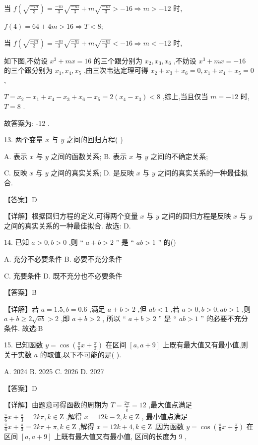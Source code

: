 \documentclass[10pt]{article}
\begin{document}
当 \(f\left( \sqrt{\frac{-m}{3}}\right)  = \frac{-m}{3}\sqrt{\frac{-m}{3}} + m\sqrt{\frac{-m}{3}} >  - {16} \Rightarrow  m >  - {12}\) 时,

\(f\left( 4\right)  = {64} + {4m} > {16} \Rightarrow  T < 8;\)

当 \(f\left( \sqrt{\frac{-m}{3}}\right)  = \frac{-m}{3}\sqrt{\frac{-m}{3}} + m\sqrt{\frac{-m}{3}} <  - {16} \Rightarrow  m <  - {12}\) 时,

如下图,不妨设 \({x}^{3} + {mx} = {16}\) 的三个跟分别为 \({x}_{2},{x}_{3},{x}_{6}\) ,不妨设 \({x}^{3} + {mx} =  - {16}\) 的三个跟分别为 \({x}_{1},{x}_{4},{x}_{5}\) ,由三次韦达定理可得 \({x}_{2} + {x}_{3} + {x}_{6} = 0,{x}_{1} + {x}_{4} + {x}_{5} = 0\) ,

\(T = {x}_{2} - {x}_{1} + {x}_{4} - {x}_{3} + {x}_{6} - {x}_{5} = 2\left( {{x}_{4} - {x}_{3}}\right)  < 8\) ,综上,当且仅当 \(m =  - {12}\) 时, \(T = 8\) .

故答案为: -12 .

13. 两个变量 \(x\) 与 \(y\) 之间的回归方程( )

A. 表示 \(x\) 与 \(y\) 之间的函数关系; B. 表示 \(x\) 与 \(y\) 之间的不确定关系;

C. 反映 \(x\) 与 \(y\) 之间的真实关系; D. 是反映 \(x\) 与 \(y\) 之间的真实关系的一种最佳拟合.

【答案】D

【详解】根据回归方程的定义,可得两个变量 \(x\) 与 \(y\) 之间的回归方程是反映 \(x\) 与 \(y\) 之间的真实关系的一种最佳拟合. 故选: D.

14. 已知 \(a > 0,b > 0\) ,则 “ \(a + b > 2\) ” 是 “ \({ab} > 1\) ” 的()

A. 充分不必要条件 B. 必要不充分条件

C. 充要条件 D. 既不充分也不必要条件

【答案】B

【详解】若 \(a = {1.5},b = {0.6}\) ,满足 \(a + b > 2\) ,但 \({ab} < 1\) ,若 \(a > 0,b > 0,{ab} > 1\) ,则 \(a + b \geq  2\sqrt{ab} > 2\) ,即 \(a + b > 2\) , 所以 “ \(a + b > 2\) ” 是 “ \({ab} > 1\) ” 的必要不充分条件. 故选:B

15. 已知函数 \(y = \cos \left( {\frac{\pi }{6}x + \frac{\pi }{3}}\right)\) 在区间 \(\left\lbrack  {a,a + 9}\right\rbrack\) 上既有最大值又有最小值,则关于实数 \(a\) 的取值,以下不可能的是( ).

A. 2024 B. 2025 C. 2026 D. 2027

【答案】D

【详解】由题意可得函数的周期为 \(T = \frac{2\pi }{\frac{\pi }{6}} = {12}\) ,最大值点满足 \(\frac{\pi }{6}x + \frac{\pi }{3} = {2k\pi },k \in  \mathrm{Z}\) ,解得 \(x = {12k} - 2,k \in  \mathrm{Z}\) , 最小值点满足 \(\frac{\pi }{6}x + \frac{\pi }{3} = {2k\pi } + \pi ,k \in  \mathrm{Z}\) ,解得 \(x = {12k} + 4,k \in  \mathrm{Z}\) ,因为函数 \(y = \cos \left( {\frac{\pi }{6}x + \frac{\pi }{3}}\right)\) 在区间 \(\left\lbrack  {a,a + 9}\right\rbrack\) 上既有最大值又有最小值, 区间的长度为 9 ,
\end{document}
